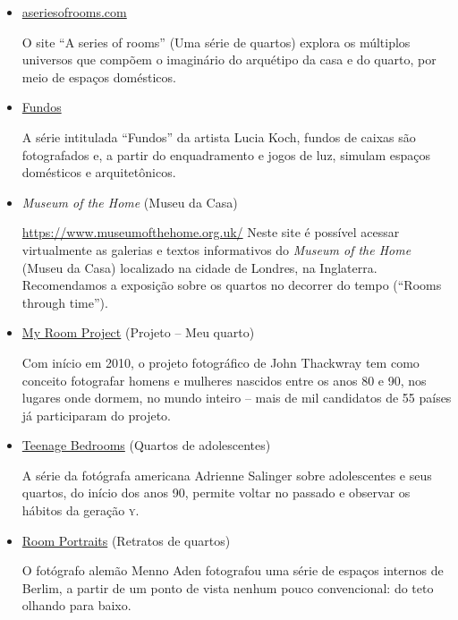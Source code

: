 \documentclass[12pt]{extarticle}
\begin{document}
\begin{itemize}

\item \href{https://aseriesofrooms.com/#/}{aseriesofrooms.com}

O site ``A series of rooms'' (Uma série de quartos) explora os 
múltiplos universos que compõem o imaginário do arquétipo da 
casa e do quarto, por meio de espaços domésticos.

\item \href{http://www.luciakoch.com/trabalhos/fundos/index_pt.htm}{Fundos}

A série intitulada ``Fundos'' da artista Lucia Koch, fundos de 
caixas são fotografados e, a partir do enquadramento e jogos de luz, 
simulam espaços domésticos e arquitetônicos.

\item \emph{Museum of the Home} (Museu da Casa)
		
\url{https://www.museumofthehome.org.uk/}
Neste site é possível acessar virtualmente as galerias e textos 
informativos do \emph{Museum of the Home} (Museu da Casa) localizado 
na cidade de Londres, na Inglaterra. Recomendamos a exposição
sobre os quartos no decorrer do tempo (``Rooms through time'').

\item \href{http://myroomphotos.com/the-project/}{My Room Project} (Projeto -- Meu quarto)

Com início em 2010, o projeto fotográfico de John Thackwray tem 
como conceito fotografar homens e mulheres nascidos entre os anos 
80 e 90, nos lugares onde dormem, no mundo inteiro -- mais de mil 
candidatos de 55 países já participaram do projeto. 

\item \href{https://www.itsnicethat.com/articles/adrienne-salinger-teenage-bedrooms-90s-120416}{Teenage Bedrooms} (Quartos de adolescentes)

A série da fotógrafa americana Adrienne Salinger sobre adolescentes 
e seus quartos, do início dos anos 90, permite voltar no passado e 
observar os hábitos da geração \textsc{y}.

\item \href{https://www.dezeen.com/2012/06/12/room-portraits-by-menno-aden/}{Room Portraits} (Retratos de quartos)

O fotógrafo alemão Menno Aden fotografou uma série de espaços internos 
de Berlim, a partir de um  ponto de vista nenhum pouco convencional: 
do teto olhando para baixo.
\end{itemize}
\end{document}
